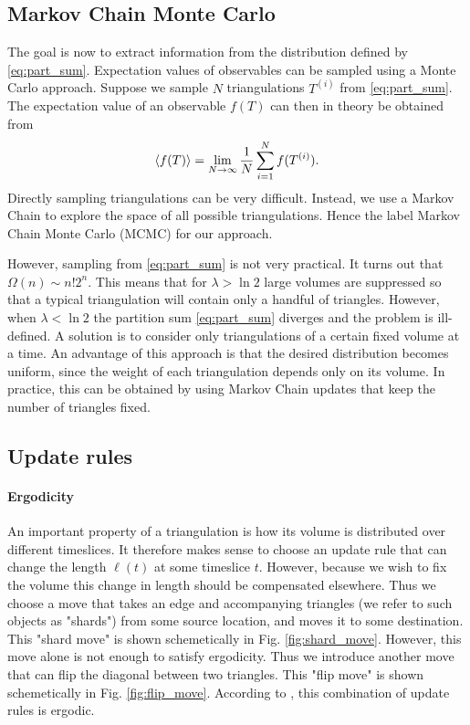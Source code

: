 
\subsection{Markov Chain Monte Carlo}

The goal is now to extract information from the distribution defined by \eqref{eq:part_sum}. Expectation values of observables can be sampled using a Monte Carlo approach. Suppose we sample $N$ triangulations $T^{(i)}$ from \eqref{eq:part_sum}. The expectation value of an observable $f(T)$ can then in theory be obtained from
\begin{equation}
    \ev{f(T)}
    =
    \lim_{N \to \infty} \frac{1}{N} \sum_{i = 1}^N f(T^{(i)})
    .
\end{equation}
Directly sampling triangulations can be very difficult. Instead, we use a Markov Chain to explore the space of all possible triangulations. Hence the label Markov Chain Monte Carlo (MCMC) for our approach.

However, sampling from \eqref{eq:part_sum} is not very practical. It turns out that $\Omega(n) \sim n! 2^n$. This means that for $\lambda > \ln 2$ large volumes are suppressed so that a typical triangulation will contain only a handful of triangles.
However, when $\lambda < \ln 2$ the partition sum \eqref{eq:part_sum} diverges and the problem is ill-defined.
A solution is to consider only triangulations of a certain fixed volume at a time.
An advantage of this approach is that the desired distribution becomes uniform, since the weight of each triangulation depends only on its volume.
In practice, this can be obtained by using Markov Chain updates that keep the number of triangles fixed.

\subsection{Update rules}
\paragraph{Ergodicity}
An important property of a triangulation is how its volume is distributed over different timeslices. It therefore makes sense to choose an update rule that can change the length $\ell(t)$ at some timeslice $t$. However, because we wish to fix the volume this change in length should be compensated elsewhere. Thus we choose a move that takes an edge and accompanying triangles (we refer to such objects as "shards") from some source location, and moves it to some destination. This "shard move" is shown schemetically in Fig. \ref{fig:shard_move}. However, this move alone is not enough to satisfy ergodicity. Thus we introduce another move that can flip the diagonal between two triangles. This "flip move" is shown schemetically in Fig. \ref{fig:flip_move}. According to \cite{2012}, this combination of update rules is ergodic.

